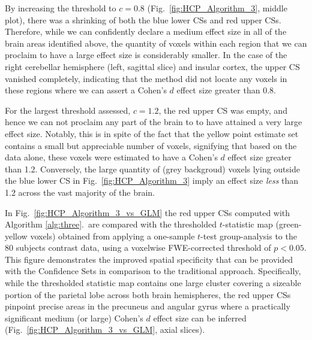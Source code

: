By increasing the threshold to $c = 0.8$ (Fig.\ \ref{fig:HCP_Algorithm_3}, middle plot), there was a shrinking of both the blue lower CSs and red upper CSs. Therefore, while we can confidently declare a medium effect size in all of the brain areas identified above, the quantity of voxels within each region that we can proclaim to have a large effect size is considerably smaller. In the case of the right cerebellar hemisphere (left, sagittal slice) and insular cortex, the upper CS vanished completely, indicating that the method did not locate any voxels in these regions where we can assert a Cohen's $d$ effect size greater than 0.8.

For the largest threshold assessed, $c = 1.2$, the red upper CS was empty, and hence we can not proclaim any part of the brain to to have attained a very large effect size. Notably, this is in spite of the fact that the yellow point estimate set contains a small but appreciable number of voxels, signifying that based on the data alone, these voxels were estimated to have a Cohen's $d$ effect size greater than 1.2. Conversely, the large quantity of (grey backgroud) voxels lying outside the blue lower CS in Fig.\ \ref{fig:HCP_Algorithm_3} imply an effect size \textit{less} than 1.2 across the vast majority of the brain.

In Fig.\ \ref{fig:HCP_Algorithm_3_vs_GLM} the red upper CSs computed with Algorithm \ref{alg:three}.\ are compared with the thresholded $t$-statistic map (green-yellow voxels) obtained from applying a one-sample $t$-test group-analysis to the 80 subjects contrast data, using a voxelwise FWE-corrected threshold of $p < 0.05$. This figure demonstrates the improved spatial specificity that can be provided with the Confidence Sets in comparison to the traditional approach. Specifically, while the thresholded statistic map contains one large cluster covering a sizeable portion of the parietal lobe across both brain hemispheres, the red upper CSs pinpoint precise areas in the precuneus and angular gyrus where a practically significant medium (or large) Cohen's $d$ effect size can be inferred (Fig.\ \ref{fig:HCP_Algorithm_3_vs_GLM}, axial slices).

